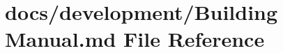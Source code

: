 \hypertarget{Building_01Manual_8md}{\section{docs/development/\+Building Manual.\+md File Reference}
\label{Building_01Manual_8md}
}

